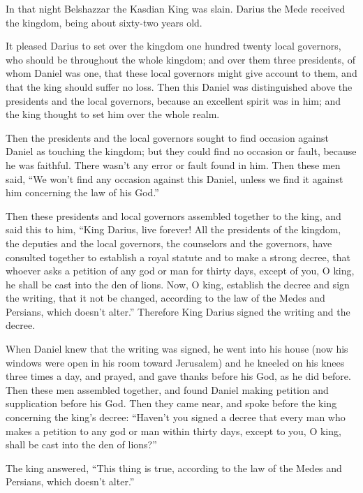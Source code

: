 \myverse{}In that night Belshazzar the Kasdian King was slain.
\myverse{}Darius the Mede received the kingdom, being about sixty-two years old.


\mychapter{} \myverse*{}It pleased Darius to set over the kingdom one hundred twenty local
governors, who should be throughout the whole kingdom;
\myverse{}and over them three presidents, of whom Daniel was one, that these local governors
might give account to them, and that the king should suffer no loss.
\myverse{}Then this Daniel was distinguished above the presidents and the local governors,
because an excellent spirit was in him; and the king thought to set him over the whole realm.

\myverse{}Then the presidents and the local governors sought to find occasion
against Daniel as touching the kingdom; but they could find no occasion or fault, because he was faithful.
There wasn’t any error or fault found in him.
\myverse{}Then these men said, “We won’t find any occasion against this Daniel, unless
we find it against him concerning the law of his God.”

\myverse{}Then these presidents and local governors assembled together to
the king, and said this to him, “King Darius, live forever!
\myverse{}All the presidents of the kingdom, the deputies and the local governors, the
counselors and the governors, have consulted together to establish a royal statute and to make a strong
decree, that whoever asks a petition of any god or man for thirty days, except of you, O king, he shall
be cast into the den of lions.
\myverse{}Now, O king, establish the decree and sign the writing, that it not be changed,
according to the law of the Medes and Persians, which doesn’t alter.”
\myverse{}Therefore King Darius signed the writing and the decree.

\myverse{}When Daniel knew that the writing was signed, he went into his
house (now his windows were open in his room toward Jerusalem) and he kneeled on his knees three times
a day, and prayed, and gave thanks before his God, as he did before.
\myverse{}Then these men assembled together, and found Daniel making petition and supplication
before his God.
\myverse{}Then they came near, and spoke before the king concerning the king’s decree:
“Haven’t you signed a decree that every man who makes a petition to any god or man within thirty days,
except to you, O king, shall be cast into the den of lions?”

The king answered, “This thing is true, according to the law of the Medes and Persians, which
doesn’t alter.”

